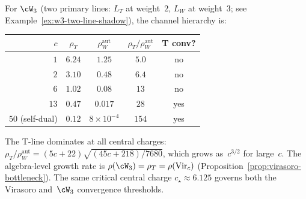\begin{remark}
For $\cW_3$ (two primary lines: $L_T$ at weight~$2$, $L_W$
at weight~$3$; see Example~\ref{ex:w3-two-line-shadow}),
the channel hierarchy is:
\begin{center}
\renewcommand{\arraystretch}{1.2}
\begin{tabular}{rcccc}
\toprule
$c$ & $\rho_T$ & $\rho_W^{\mathrm{aut}}$
  & $\rho_T/\rho_W^{\mathrm{aut}}$ & T conv? \\
\midrule
$1$ & $6.24$ & $1.25$ & $5.0$ & no \\
$2$ & $3.10$ & $0.48$ & $6.4$ & no \\
$6$ & $1.02$ & $0.08$ & $13$ & no \\
$13$ & $0.47$ & $0.017$ & $28$ & yes \\
$50$ (self-dual) & $0.12$ & $8\times 10^{-4}$ & $154$ & yes \\
\bottomrule
\end{tabular}
\end{center}
\noindent
The T-line dominates at all central charges:
$\rho_T/\rho_W^{\mathrm{aut}}
= (5c{+}22)\sqrt{(45c{+}218)/7680}$,
which grows as~$c^{3/2}$ for large~$c$.
The algebra-level growth rate
is $\rho(\cW_3) = \rho_T = \rho(\mathrm{Vir}_c)$
(Proposition~\ref{prop:virasoro-bottleneck}).
The same critical central charge $c_\star \approx 6.125$
governs both the Virasoro and~$\cW_3$ convergence
thresholds.
\end{remark}

